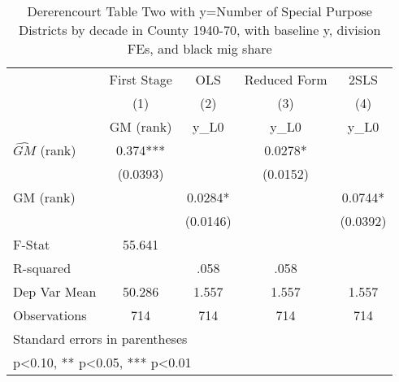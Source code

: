 \begin{table}[htbp]\centering
\def\sym#1{\ifmmode^{#1}\else\(^{#1}\)\fi}
\caption{Dererencourt Table Two with y=Number of Special Purpose Districts by decade in County 1940-70, with baseline y, division FEs, and black mig share}
\begin{tabular}{l*{4}{c}}
\toprule
                    & First Stage   &         OLS   &Reduced Form   &        2SLS   \\
                    &\multicolumn{1}{c}{(1)}&\multicolumn{1}{c}{(2)}&\multicolumn{1}{c}{(3)}&\multicolumn{1}{c}{(4)}\\
                    &\multicolumn{1}{c}{GM  (rank)}&\multicolumn{1}{c}{y\_L0}&\multicolumn{1}{c}{y\_L0}&\multicolumn{1}{c}{y\_L0}\\
\midrule
$\hat{GM}$ (rank)   &       0.374***&               &      0.0278*  &               \\
                    &    (0.0393)   &               &    (0.0152)   &               \\
\addlinespace
GM  (rank)          &               &      0.0284*  &               &      0.0744*  \\
                    &               &    (0.0146)   &               &    (0.0392)   \\
\midrule
F-Stat              &      55.641   &               &               &               \\
R-squared           &               &        .058   &        .058   &               \\
Dep Var Mean        &      50.286   &       1.557   &       1.557   &       1.557   \\
Observations        &         714   &         714   &         714   &         714   \\
\bottomrule
\multicolumn{5}{l}{\footnotesize Standard errors in parentheses}\\
\multicolumn{5}{l}{\footnotesize * p<0.10, ** p<0.05, *** p<0.01}\\
\end{tabular}
\end{table}
